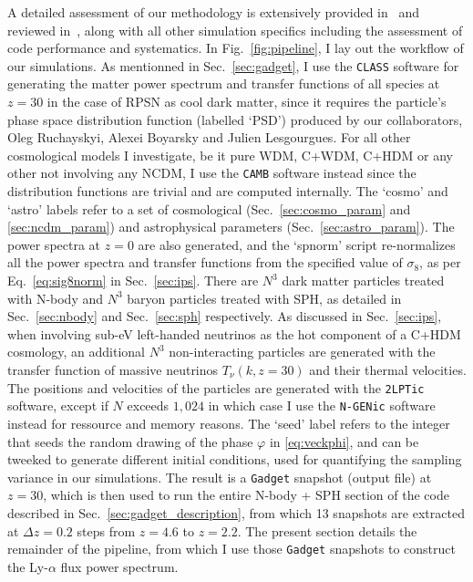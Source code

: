 A detailed assessment of our methodology is extensively provided in~\cite{Borde2014, Palanque2015a} and reviewed in~\cite{Palanque2015b}, along with all other simulation specifics including the assessment of code performance and systematics. In Fig.~\ref{fig:pipeline}, I lay out the workflow of our simulations. As mentionned in Sec.~\ref{sec:gadget}, I use the \texttt{CLASS} software for generating the matter power spectrum and transfer functions of all species at $z=30$ in the case of RPSN as cool dark matter, since it requires the particle's phase space distribution function (labelled `PSD') produced by our collaborators, Oleg Ruchayskyi, Alexei Boyarsky and Julien Lesgourgues. For all other cosmological models I investigate, be it pure WDM, C+WDM, C+HDM or any other not involving any NCDM, I use the \texttt{CAMB} software instead since the distribution functions are trivial and  are computed internally. The `cosmo' and `astro' labels refer to a set of cosmological (Sec.~\ref{sec:cosmo_param} and \ref{sec:ncdm_param}) and astrophysical parameters (Sec.~\ref{sec:astro_param}). The power spectra at $z=0$ are also generated, and the `spnorm' script re-normalizes all the power spectra and transfer functions from the specified value of $\sigma_8$, as per Eq.~\ref{eq:sig8norm} in Sec.~\ref{sec:ips}. There are $N^3$ dark matter particles treated with N-body and $N^3$ baryon particles treated with SPH, as detailed in Sec.~\ref{sec:nbody} and Sec.~\ref{sec:sph} respectively. As discussed in Sec.~\ref{sec:ips}, when involving sub-eV left-handed neutrinos as the hot component of a C+HDM cosmology, an additional $N^3$ non-interacting particles are generated with the transfer function of massive neutrinos $T_\nu (k, z=30)$ and their thermal velocities. The positions and velocities of the particles are generated with the \texttt{2LPTic} software, except if $N$ exceeds $1,024$ in which case I use the \texttt{N-GENic} software instead for ressource and memory reasons. The `seed' label refers to the integer that seeds the random drawing of the phase $\varphi$ in \ref{eq:veckphi}, and can be tweeked to generate different initial conditions, used for quantifying the sampling variance in our simulations. The result is a \texttt{Gadget} snapshot (output file) at $z=30$, which is then used to run the entire N-body + SPH section of the code described in Sec.~\ref{sec:gadget_description}, from which 13 snapshots are extracted at $\Delta z = 0.2$ steps from $z=4.6$ to $z=2.2$. The present section details the remainder of the pipeline, from which I use those \texttt{Gadget} snapshots to construct the Ly-$\alpha$ flux power spectrum.



